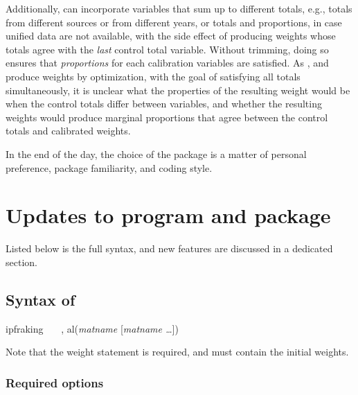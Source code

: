 Additionally,  can incorporate variables
that sum up to different totals, e.g., totals from different sources
or from different years, or totals and proportions, in case unified data 
are not available, with the side effect of producing weights whose totals agree
with the \textit{last} control total variable. Without trimming, doing so ensures
that \textit{proportions} for each calibration variables are satisfied. 
As ,
 and  produce weights by optimization,
with the goal of satisfying all totals simultaneously, it is unclear
what the properties of the resulting weight would be when the control totals
differ between variables, and whether the resulting weights would produce 
marginal proportions that agree between the control totals and calibrated weights.

In the end of the day,
the choice of the package is a matter of personal preference, package familiarity,
and coding style. 


\section{Updates to  program and package}

Listed below is the full syntax, and new features are discussed in a dedicated section.

\subsection{Syntax of }
\label{subsec:syntax}

\begin{stsyntax}
ipfraking
\optif\
\optin\
\optweight\
,
al({\it matname} [{\it matname \ldots}])
\end{stsyntax}

\hangpara
Note that the weight statement \stcmd{[pw=\varname]} is required, and must contain the initial weights.

\subsubsection{Required options}


